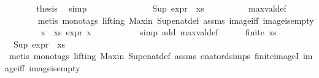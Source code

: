 \begin{isabellebody}
\ \ \ \ \isamarkupfalse%
\ \isamarkupfalse%
\ {\isacharquery}{\kern0pt}thesis\ \isamarkupfalse%
\ simp\isanewline
\ \ \isamarkupfalse%
\isanewline
\ \ \ \ \isamarkupfalse%
\ {}\isanewline
\ \ \ \ \isamarkupfalse%
\ {\isachardoublequoteopen}Sup\ {\isacharparenleft}{\kern0pt}expr{\isacharunderscore}{\kern0pt}{}\ {\isacharbackquote}{\kern0pt}\ xs{\isacharparenright}{\kern0pt}\ {\isacharequal}{\kern0pt}\ {\isasyminfinity}{\isachardoublequoteclose}\isanewline
\ \ \ \ \ \ \isamarkupfalse%
\ max{\isacharunderscore}{\kern0pt}val{\isacharunderscore}{\kern0pt}def\isanewline
\ \ \ \ \ \ \isamarkupfalse%
\ {\isacharparenleft}{\kern0pt}metis\ {\isacharparenleft}{\kern0pt}mono{\isacharunderscore}{\kern0pt}tags{\isacharcomma}{\kern0pt}\ lifting{\isacharparenright}{\kern0pt}\ Max{\isacharunderscore}{\kern0pt}in\ Sup{\isacharunderscore}{\kern0pt}enat{\isacharunderscore}{\kern0pt}def\ assms\ image{\isacharunderscore}{\kern0pt}iff\ image{\isacharunderscore}{\kern0pt}is{\isacharunderscore}{\kern0pt}empty{\isacharparenright}{\kern0pt}\isanewline
\ \ \ \ \isamarkupfalse%
\ {}\ \isamarkupfalse%
\ {\isachardoublequoteopen}{\isasymforall}x\ {\isasymin}\ xs{\isachardot}{\kern0pt}\ expr{\isacharunderscore}{\kern0pt}{}\ x\ {\isacharless}{\kern0pt}\ {\isasyminfinity}{\isachardoublequoteclose}\ \isanewline
\ \ \ \ \ \ \isamarkupfalse%
\ {\isacharparenleft}{\kern0pt}simp\ add{\isacharcolon}{\kern0pt}\ max{\isacharunderscore}{\kern0pt}val{\isacharunderscore}{\kern0pt}def{\isacharparenright}{\kern0pt}\isanewline
\ \ \ \ \isamarkupfalse%
\ {\isachardoublequoteopen}{\isasymnot}{\isacharparenleft}{\kern0pt}finite\ xs{\isacharparenright}{\kern0pt}{\isachardoublequoteclose}\ \isamarkupfalse%
\ {}\ {\isacartoucheopen}Sup\ {\isacharparenleft}{\kern0pt}expr{\isacharunderscore}{\kern0pt}{}\ {\isacharbackquote}{\kern0pt}\ xs{\isacharparenright}{\kern0pt}\ {\isacharequal}{\kern0pt}\ {\isasyminfinity}{\isacartoucheclose}\ \isanewline
\ \ \ \ \ \ \isamarkupfalse%
\ {\isacharparenleft}{\kern0pt}metis\ {\isacharparenleft}{\kern0pt}mono{\isacharunderscore}{\kern0pt}tags{\isacharcomma}{\kern0pt}\ lifting{\isacharparenright}{\kern0pt}\ Max{\isacharunderscore}{\kern0pt}in\ Sup{\isacharunderscore}{\kern0pt}enat{\isacharunderscore}{\kern0pt}def\ assms\ enat{\isacharunderscore}{\kern0pt}ord{\isacharunderscore}{\kern0pt}simps{\isacharparenleft}{\kern0pt}{}{\isacharparenright}{\kern0pt}\ finite{\isacharunderscore}{\kern0pt}imageI\ image{\isacharunderscore}{\kern0pt}iff\ image{\isacharunderscore}{\kern0pt}is{\isacharunderscore}{\kern0pt}empty{\isacharparenright}{\kern0pt}\isanewline

\end{isabellebody}
